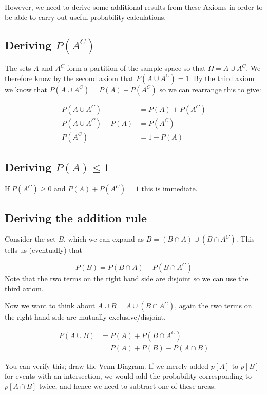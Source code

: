 \documentclass[12pt]{extbook}
\begin{document}
However, we need to derive some additional results from these Axioms in order to be able to carry out useful probability calculations.



\subsection{Deriving $P(A^C)$}

The sets $A$ and $A^C$ form a partition of the sample space so that $\Omega = A \cup A^C$.   We therefore know by the second axiom that $P(A \cup A^C) = 1$.   By the third axiom we know that $P(A \cup A^C) = P(A) + P(A^C)$ so we can rearrange this to give:

\begin{align*}
P(A \cup A^C) &= P(A) + P(A^C) \\
P(A \cup A^C) - P(A) &= P(A^C) \\
P(A^C) &= 1 - P(A)
\end{align*}

\subsection{Deriving $P(A) \leq 1$}

If $P(A^C) \geq 0$ and $P(A) + P(A^C) = 1$ this is immediate.

\subsection{Deriving the addition rule}

Consider the set $B$, which we can expand as $B=(B \cap A) \cup (B \cap A^C)$.   This tells us (eventually) that

\begin{displaymath}
P(B) = P(B \cap A) + P(B \cap A^C)
\end{displaymath}
Note that the two terms on the right hand side are disjoint so we can use the third axiom.

Now we want to think about $A \cup B = A \cup (B \cap A^C)$, again the two terms on the right hand side are mutually exclusive/disjoint.   

\begin{align*}
P(A \cup B) &= P(A) + P(B \cap A^C) \\
 &= P(A) + P(B) - P(A \cap B)
 \end{align*}



You can verify this; draw the Venn Diagram.   If we merely added $p[A]$ to $p[B]$ for events with an intersection, we would add the probability corresponding to $p[A \cap B]$ twice, and hence we need to subtract one of these areas.
\end{document}
